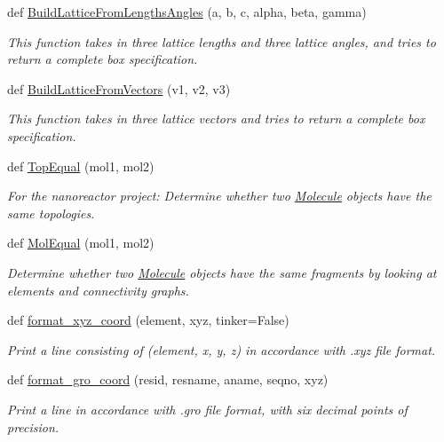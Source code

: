 \begin{DoxyCompactItemize}
def \hyperlink{namespacesrc_1_1molecule_a037d06bd9038517f2784bce4e0ad6d86}{Build\+Lattice\+From\+Lengths\+Angles} (a, b, c, alpha, beta, gamma)
\begin{DoxyCompactList}\small\item\em This function takes in three lattice lengths and three lattice angles, and tries to return a complete box specification. \end{DoxyCompactList}\item 
def \hyperlink{namespacesrc_1_1molecule_a49fbd57aae59219cb5fb85c22362b1f3}{Build\+Lattice\+From\+Vectors} (v1, v2, v3)
\begin{DoxyCompactList}\small\item\em This function takes in three lattice vectors and tries to return a complete box specification. \end{DoxyCompactList}\item 
def \hyperlink{namespacesrc_1_1molecule_af3d73b03a8dc403bb7372b8f83f88245}{Top\+Equal} (mol1, mol2)
\begin{DoxyCompactList}\small\item\em For the nanoreactor project\+: Determine whether two \hyperlink{classsrc_1_1molecule_1_1Molecule}{Molecule} objects have the same topologies. \end{DoxyCompactList}\item 
def \hyperlink{namespacesrc_1_1molecule_a6b9b3403d57a07cf94d7a47a73e67da8}{Mol\+Equal} (mol1, mol2)
\begin{DoxyCompactList}\small\item\em Determine whether two \hyperlink{classsrc_1_1molecule_1_1Molecule}{Molecule} objects have the same fragments by looking at elements and connectivity graphs. \end{DoxyCompactList}\item 
def \hyperlink{namespacesrc_1_1molecule_a909fc56c7a55c16eca1c668819cf6a1a}{format\+\_\+xyz\+\_\+coord} (element, xyz, tinker=False)
\begin{DoxyCompactList}\small\item\em Print a line consisting of (element, x, y, z) in accordance with .xyz file format. \end{DoxyCompactList}\item 
def \hyperlink{namespacesrc_1_1molecule_a081f51f922805fee2d219661d7d31743}{format\+\_\+gro\+\_\+coord} (resid, resname, aname, seqno, xyz)
\begin{DoxyCompactList}\small\item\em Print a line in accordance with .gro file format, with six decimal points of precision. \end{DoxyCompactList}\item 

\end{DoxyCompactItemize}
